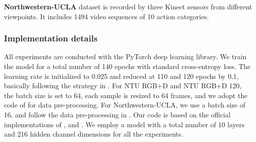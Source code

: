 \documentclass[10pt,twocolumn,letterpaper]{article}
\begin{document}
\noindent
\textbf{Northwestern-UCLA} \cite{wang2014cross} dataset is
recorded by three Kinect sensors from different viewpoints. It includes 1494 video sequences of 10 action categories. 




\subsubsection{Implementation details}
\label{implement}
All experiments are conducted with the PyTorch \cite{paszke2019pytorch} deep learning library.
We train the model for a total number of 140 epochs with standard cross-entropy loss.
The learning rate is initialized to 0.025 and reduced at 110 and 120 epochs by 0.1, basically following the strategy in \cite{chi2022infogcn}.
For NTU RGB+D and NTU RGB+D 120, the batch size is set to 64, each sample is resized to 64 frames, and we adopt the code of \cite{zhang2020semantics} for data pre-processing.
For Northwestern-UCLA, we use a batch size of 16, and
follow the data pre-processing in \cite{cheng2020skeleton,chen2021channel}.
Our code is based on the official implementations of \cite{touvron2021training}, \cite{chen2021channel} and \cite{zhang2020semantics}. We employ a model with a total number of 10 layers and 216 hidden channel dimensions for all the experiments.
\end{document}
